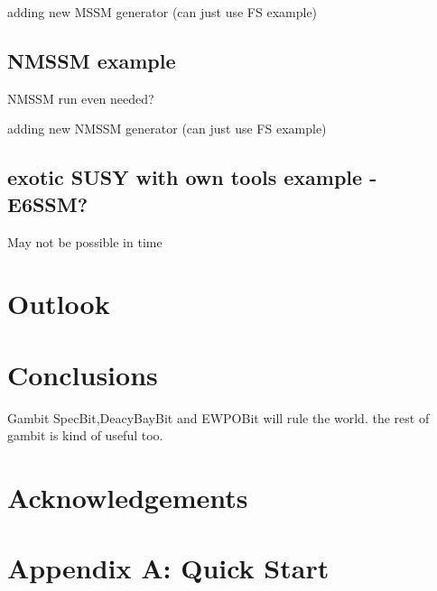 \documentclass[11pt,a4paper]{article}
\begin{document}
adding new MSSM generator (can just use FS example)
\subsection{NMSSM example}
NMSSM run even needed?

adding new NMSSM generator (can just use FS example)
\subsection{exotic SUSY with own tools example - E6SSM?}
May not be possible in time

\section{Outlook}

\section{Conclusions}
Gambit SpecBit,DeacyBayBit and EWPOBit will rule the world.  the rest of gambit is kind of useful too.
\section{Acknowledgements}

\section{Appendix A: Quick Start}
\end{document}
